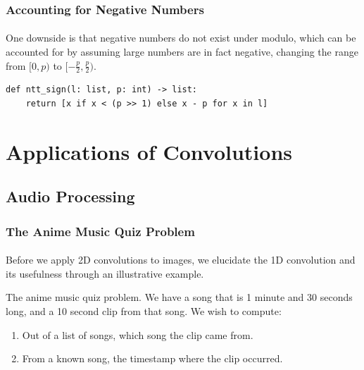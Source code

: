\documentclass[11pt,handout]{beamer}             %
\begin{document}
\begin{frame}[fragile]
\frametitle{Accounting for Negative Numbers}
\framesubtitle{}
One downside is that negative numbers do not exist under modulo, which can
be accounted for by assuming large numbers are in fact negative,
changing the range from \( [0, p) \) to \( [-\frac{p}{2}, \frac{p}{2}) \).
\begin{verbatim}
def ntt_sign(l: list, p: int) -> list:
    return [x if x < (p >> 1) else x - p for x in l]
\end{verbatim}
\end{frame}

\section[Applications]{Applications of Convolutions}
\subsection[Audio]{Audio Processing}
\begin{frame}
\frametitle{The Anime Music Quiz Problem}
\framesubtitle{}
Before we apply 2D convolutions to images, we elucidate the 1D convolution
and its usefulness through an illustrative example.
\begin{exampleblock}{The anime music quiz problem.}
We have a song that is 1 minute and 30 seconds long,
and a 10 second clip from that song. We wish to compute:
\begin{enumerate}
  \item<2-> Out of a list of songs, which song the clip came from.
  \item<3-> From a known song, the timestamp where the clip occurred.
\end{enumerate}
\end{exampleblock}
\end{frame}
\end{document}
